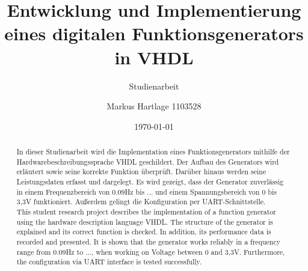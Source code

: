 \documentclass[BCOR=1cm, twoside, ngerman]{scrreprt}
\title{Entwicklung und Implementierung eines digitalen Funktionsgenerators in VHDL}
\subtitle{Studienarbeit}
\author{Markus Hartlage 1103528}
\date{\today} %
\begin{document}
\maketitle

\begin{abstract}
  In dieser Studienarbeit wird die Implementation eines Funktionsgenerators mithilfe der Hardwarebeschreibungssprache VHDL geschildert.
  Der Aufbau des Generators wird erläutert sowie seine korrekte Funktion überprüft.
  Darüber hinaus werden seine Leistungsdaten erfasst und dargelegt.
  Es wird gezeigt, dass der Generator zuverlässig in einem Frequenzbereich von 0.09Hz bis ... und einem Spannungsbereich von 0 bis 3,3V funktioniert. Außerdem gelingt die Konfiguration per UART-Schnittstelle.\\

  This student research project describes the implementation of a function generator using the hardware description language VHDL.
  The structure of the generator is explained and its correct function is checked.
  In addition, its performance data is recorded and presented.
  It is shown that the generator works reliably in a frequency range from 0.09Hz to ..., when working on Voltage between 0 and 3,3V. Furthermore, the configuration via UART interface is tested successfully.

\end{abstract}

\tableofcontents
\printbibliography[heading=bibintoc, title={Literaturverzeichnis}]





\end{document}
